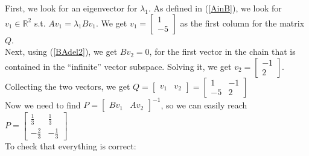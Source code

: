 First, we look for an eigenvector for $\lambda_1$. As defined in (\ref{AinB}), we look for $v_1 \in \mathbb{R}^2$ s.t. $Av_1 = \lambda_1Bv_1$. We get $v_1 = \begin{bmatrix} 1 \\ -5 \end{bmatrix}$ as the first column for the matrix $Q$.  \vspace{1em} \\ 
Next, using (\ref{BAdel2}), we get $Bv_2 = 0$, for the first vector in the chain that is contained in the ``infinite'' vector subspace. Solving it, we get $v_2 = \begin{bmatrix} -1 \\ 2 \end{bmatrix}$. \\
Collecting the two vectors, we get $Q = \begin{bmatrix} v_1 & v_2 \end{bmatrix} = \begin{bmatrix} 1 & -1 \\ -5 & 2 \end{bmatrix}$ \\
Now we need to find $P = \begin{bmatrix} Bv_1 & Av_2 \end{bmatrix}^{-1}$, so we can easily reach $P = \begin{bmatrix} \frac{1}{3} & \frac{1}{3} \\ -\frac{2}{3} & -\frac{1}{3} \end{bmatrix}$ \\
To check that everything is correct: 
